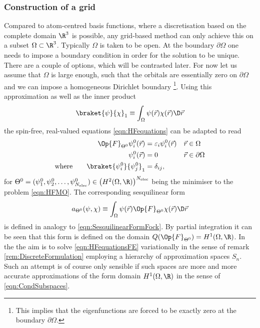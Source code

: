 \subsubsection{Construction of a \FE grid}
Compared to atom-centred basis functions,
where a discretisation based on the complete domain $\R^3$ is possible,
any grid-based method can only achieve this
on a subset $\Omega \subset \R^3$.
Typically $\Omega$ is taken to be open.
At the boundary $\partial\Omega$ one needs
to impose a boundary condition in order for the solution to be unique.
There are a couple of options, which will be contrasted later.
For now let us assume that $\Omega$ is large enough,
such that the \SCF orbitals are essentially zero on $\partial\Omega$
and we can impose a homogeneous Dirichlet boundary%
\footnote{This implies that the \HF eigenfunctions are forced
	to be exactly zero at the boundary $\partial\Omega$.}.
Using this approximation
as well as the inner product
\[ \braket{\psi}{\chi}_1 \equiv \int_\Omega \psi(\vec{r}) \chi(\vec{r})  \D \vec{r} \]
the spin-free, real-valued \HF equations \eqref{eqn:HFequations} can be adapted to read
%
\begin{equation}
\label{eqn:HFequationsFE}
\begin{aligned}
	\Op{F}_{\Theta^0} \psi_i^0(\vec{r}) &= \varepsilon_i \psi_i^0(\vec{r}) && \vec{r} \in \Omega \\
	\psi_i^0(\vec{r}) &=0 &&\vec{r} \in \partial \Omega \\
	\text{where}\qquad \braket{\psi_i^0}{\psi_j^0}_1 &= \delta_{ij},
\end{aligned}
\end{equation}
for $\Theta^0 = (\psi_1^0, \psi_2^0, \ldots, \psi_{\Nelec}^0) \in \left( H^2(\Omega,\R) \right)^{\Nelec}$
being the minimiser to the \HF problem \eqref{eqn:HFMO}.
The corresponding sesquilinear form
\[ a_{\Theta^0}(\psi, \chi)
	\equiv \int_\Omega \psi(\vec{r}) \Op{F}_{\Theta^0} \chi(\vec{r}) \D \vec{r} \]
is defined in analogy to \eqref{eqn:SesquilinearFormFock}.
By partial integration it can be seen that this form
is defined on the domain $Q(\Op{F}_{\Theta^0}) = H^1(\Omega, \R)$.
In the 
the aim is to solve \eqref{eqn:HFequationsFE} variationally
in the sense of remark \vref{rem:DiscreteFormulation}
employing a hierarchy of approximation spaces $S_n$.
Such an attempt is of course only sensible
if such spaces are more and more accurate
approximations of the form domain $H^1(\Omega, \R)$
in the sense of \eqref{eqn:CondSubspaces}.

